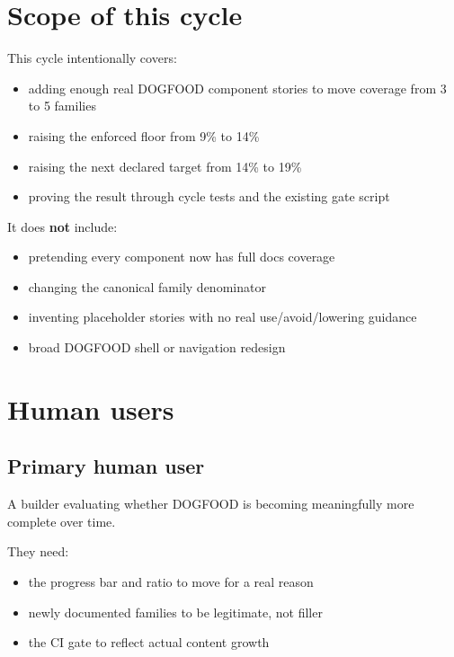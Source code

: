 \section{Scope of this cycle}\label{record-066-scope-of-this-cycle}

This cycle intentionally covers:

\begin{itemize}
\tightlist
\item
  adding enough real DOGFOOD component stories to move coverage from 3 to 5 families
\item
  raising the enforced floor from 9\% to 14\%
\item
  raising the next declared target from 14\% to 19\%
\item
  proving the result through cycle tests and the existing gate script
\end{itemize}

It does \textbf{not} include:

\begin{itemize}
\tightlist
\item
  pretending every component now has full docs coverage
\item
  changing the canonical family denominator
\item
  inventing placeholder stories with no real use/avoid/lowering guidance
\item
  broad DOGFOOD shell or navigation redesign
\end{itemize}

\section{Human users}\label{record-066-human-users}

\subsection{Primary human user}\label{record-066-primary-human-user}

A builder evaluating whether DOGFOOD is becoming meaningfully more complete over time.

They need:

\begin{itemize}
\tightlist
\item
  the progress bar and ratio to move for a real reason
\item
  newly documented families to be legitimate, not filler
\item
  the CI gate to reflect actual content growth
\end{itemize}

